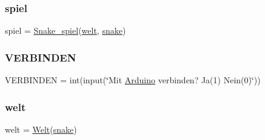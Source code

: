 \subsubsection{\texorpdfstring{spiel}{spiel}}
{\footnotesize\ttfamily spiel = \mbox{\hyperlink{class_projekt_01_snake_01auf_01_python_1_1_snake__spiel}{Snake\+\_\+spiel}}(\mbox{\hyperlink{namespace_projekt_01_snake_01auf_01_python_a80417409ca56d97eabc593c02dbb4a1c}{welt}}, \mbox{\hyperlink{namespace_projekt_01_snake_01auf_01_python_aa798779259654cac04213978cf4297ab}{snake}})}

\mbox{\label{namespace_projekt_01_snake_01auf_01_python_a494a6a834239a0d8becd8a87a00ec956}} 
\subsubsection{\texorpdfstring{V\+E\+R\+B\+I\+N\+D\+EN}{VERBINDEN}}
{\footnotesize\ttfamily V\+E\+R\+B\+I\+N\+D\+EN = int(input(\char`\"{}Mit \mbox{\hyperlink{class_projekt_01_snake_01auf_01_python_1_1_arduino}{Arduino}} verbinden? Ja(1) Nein(0)\char`\"{}))}

\mbox{\label{namespace_projekt_01_snake_01auf_01_python_a80417409ca56d97eabc593c02dbb4a1c}} 
\subsubsection{\texorpdfstring{welt}{welt}}
{\footnotesize\ttfamily welt = \mbox{\hyperlink{class_projekt_01_snake_01auf_01_python_1_1_welt}{Welt}}(\mbox{\hyperlink{namespace_projekt_01_snake_01auf_01_python_aa798779259654cac04213978cf4297ab}{snake}})}

\mbox{\label{namespace_projekt_01_snake_01auf_01_python_a0bb194ef42a009e15b75b9c78234ec82}} 
